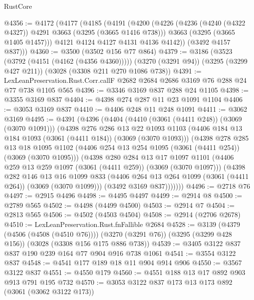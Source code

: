 \begin{lexlean}{RustCore}
\begin{coremodule}
@4356 := @4172
    (@4177
      (@4185
        (@4191
          (@4200
            (@4226
              (@4236 (@4240 (@4322 @4327)) @4291 @3663 (@3295 (@3665 @1416 @738)))
              @3663
              (@3295 (@3665 @1405 @1457)))
            @4121
            @4124
            @4127
            @4131
            @4136
            @4142))
        (@3492 @4157 @837)))
@4360 := @3500 (@3502 @156 @77 @864)
@4379 := @3186
    (@3523 (@3792 (@4151 (@4162 (@4356 @4360)))))
    (@3270 (@3291 @94))
    (@3295 (@3299 @427 @211))
    (@3028 (@3308 @211 @270 @1086 @738))
@4391 := LexLeanPreservation.Rust.Corr.callF
    @2682
    @2684
    @2686
    @3169
    @76
    @288
    @24
    @77
    @738
    @1105
    @565
@4396 := @3346 @3169 @837 @288 @24 @1105
@4398 := @3355 @3169 @837
@4404 := @4398 @274 @287 @11 @23 @1091 @1104
@4406 := @3053 @3169 @837
@4410 := @4406 @248 @11 @248 @1091
@4411 := @3062 @3169
@4495 := @4391
    (@4396
      (@4404
        (@4410 (@3061 (@4411 @248)) (@3069 (@3070 @1091)))
        (@4398
          @276
          @286
          @13
          @22
          @1093
          @1103
          (@4406 @184 @13 @184 @1093 (@3061 (@4411 @184)) (@3069 (@3070 @1093)))
          (@4398
            @278
            @285
            @13
            @18
            @1095
            @1102
            (@4406 @254 @13 @254 @1095 (@3061 (@4411 @254)) (@3069 (@3070 @1095)))
            (@4398
              @280
              @284
              @13
              @17
              @1097
              @1101
              (@4406 @259 @13 @259 @1097 (@3061 (@4411 @259)) (@3069 (@3070 @1097)))
              (@4398
                @282
                @146
                @13
                @16
                @1099
                @833
                (@4406 @264 @13 @264 @1099 (@3061 (@4411 @264)) (@3069 (@3070 @1099)))
                (@3492 @3169 @837)))))))
@4496 := @2718 @76
@4497 := @2915 @4496
@4498 := @4495 @4497
@4499 := @2914 @8
@4500 := @2789 @565
@4502 := @4498 (@4499 @4500)
@4503 := @2914 @7
@4504 := @2813 @565
@4506 := @4502 (@4503 @4504)
@4508 := @2914 (@2706 @2678)
@4510 := LexLeanPreservation.Rust.fnFallible @2684
@4528 := @3139
    (@4379 (@4506 (@4508 (@4510 @76))))
    (@3270 (@3291 @76))
    (@3295 (@3299 @428 @156))
    (@3028 (@3308 @156 @175 @886 @738))
@4539 := @3405 @3122 @837 @837 @190 @239 @164 @77 @904 @916 @738 @1061
@4541 := @3554 @3122 @837
@4548 := @4541 @177 @189 @18 @11 @904 @914 @906
@4550 := @3567 @3122 @837
@4551 := @4550 @179
@4560 := @4551 @188 @13 @17 @892 @903 @913 @791 @195 @732
@4570 := @3053 @3122 @837 @173 @13 @173 @892 (@3061 (@3062 @3122 @173))

\end{coremodule}
\end{lexlean}

